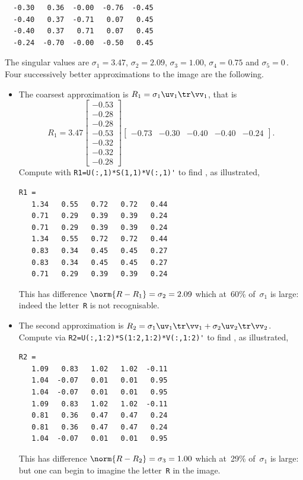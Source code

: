 \begin{example}
\begin{solution}
\begin{verbatim}
  -0.30   0.36  -0.00  -0.76  -0.45
  -0.40   0.37  -0.71   0.07   0.45
  -0.40   0.37   0.71   0.07   0.45
  -0.24  -0.70  -0.00  -0.50   0.45
\end{verbatim}
\setbox\ajrqrbox\hbox{}%
\marginpar{\usebox{\ajrqrbox\\[2ex]}}%
The singular values are \(\sigma_1=3.47\), \(\sigma_2=2.09\), \(\sigma_3=1.00\), \(\sigma_4=0.75\) and \(\sigma_5=0\)\,.
Four successively better approximations to the image are the following.
\begin{itemize}
\item  
The coarsest approximation is \(R_1=\sigma_1\uv_1\tr\vv_1\), that is
{\small\begin{equation*}
R_1=3.47
\begin{bmatrix} -0.53\\-0.28\\-0.28\\-0.53\\-0.32\\-0.32\\-0.28 \end{bmatrix}
\begin{bmatrix} -0.73&-0.30&-0.40&-0.40&-0.24 \end{bmatrix}.
\end{equation*}}%
Compute with \verb|R1=U(:,1)*S(1,1)*V(:,1)'| to find \twodp, as illustrated,
\marginpar{}
\begin{verbatim}
R1 =
   1.34   0.55   0.72   0.72   0.44
   0.71   0.29   0.39   0.39   0.24
   0.71   0.29   0.39   0.39   0.24
   1.34   0.55   0.72   0.72   0.44
   0.83   0.34   0.45   0.45   0.27
   0.83   0.34   0.45   0.45   0.27
   0.71   0.29   0.39   0.39   0.24
\end{verbatim}
This has difference \(\norm{R-R_1}=\sigma_2=2.09\) which at~60\% of~\(\sigma_1\) is large: indeed the letter~\verb|R| is not recognisable.

\item The second approximation is \(R_2=\sigma_1\uv_1\tr\vv_1+\sigma_2\uv_2\tr\vv_2\).
Compute via \verb|R2=U(:,1:2)*S(1:2,1:2)*V(:,1:2)'| to find \twodp, as illustrated, 
\marginpar{}
\begin{verbatim}
R2 =
   1.09   0.83   1.02   1.02  -0.11
   1.04  -0.07   0.01   0.01   0.95
   1.04  -0.07   0.01   0.01   0.95
   1.09   0.83   1.02   1.02  -0.11
   0.81   0.36   0.47   0.47   0.24
   0.81   0.36   0.47   0.47   0.24
   1.04  -0.07   0.01   0.01   0.95
\end{verbatim}
This has difference \(\norm{R-R_2}=\sigma_3=1.00\) which at~29\% of~\(\sigma_1\) is large: but one can begin to imagine the letter~\verb|R| in the image.
 

\end{itemize}
\end{solution}
\end{example}
